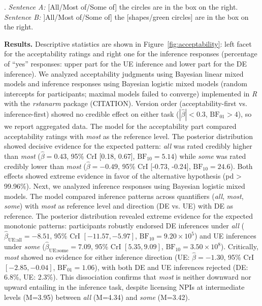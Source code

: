 \documentclass[12pt, a4]{article}
\begin{document}
\ex.\label{inftask}
\textit{Sentence A:} [All/Most of/Some of] the circles are in the box on the right.\\
\textit{Sentence B:} ]All/Most of/Some of] the [shapes/green circles] are in the box on the right.\vspace{-2mm}


\noindent \textbf{Results.} Descriptive statistics are shown in Figure~\ref{fig:acceptability}: left facet for the acceptability ratings and right one for the inference responses (percentage of ``yes'' responses: upper part for the UE inference and lower part for the DE inference). We analyzed acceptability judgments using Bayesian linear mixed models and inference responses using Bayesian logistic mixed models (random intercepts for participants; maximal models failed to converge) implemented in \textit{R} with the \textit{rstanarm} package (CITATION). Version order (acceptability-first vs. inference-first) showed no credible effect on either task ($|\hat{\beta}| < 0.3$, $\text{BF}_{01} > 4$), so we report aggregated data. The model for the acceptability part compared acceptability ratings with \textit{most} as the reference level. The posterior distribution showed decisive evidence for the expected pattern: \textit{all} was rated credibly higher than \textit{most} ($\hat{\beta}=0.43$, 95\% CrI [0.18, 0.67], $\text{BF}_{10}=5.14$) while \textit{some} was rated credibly lower than \textit{most} ($\hat{\beta}=-0.49$, 95\% CrI [-0.73, -0.24], $\text{BF}_{10}=24.6$). Both effects showed extreme evidence in favor of the alternative hypothesis (pd > 99.96\%). Next, we analyzed inference responses using Bayesian logistic mixed models. The model compared inference patterns across quantifiers (\textit{all}, \textit{most}, \textit{some}) with \textit{most} as reference level and direction (DE vs. UE) with DE as reference. The posterior distribution revealed extreme evidence for the expected monotonic patterns: participants robustly endorsed DE inferences under \textit{all} ($\hat{\beta}_{\text{UE:all}}=-8.51$, 95\% CrI $[-11.57, -5.97]$, $\text{BF}_{10}=9.20\times10^5$) and UE inferences under \textit{some} ($\hat{\beta}_{\text{UE:some}}=7.09$, 95\% CrI $[5.35, 9.09]$, $\text{BF}_{10}=3.50\times10^8$). Critically, \textit{most} showed no evidence for either inference direction (UE: $\hat{\beta}=-1.30$, 95\% CrI $[-2.85, -0.04]$, $\text{BF}_{01}=1.06$), with both DE and UE inferences rejected (DE: 6.8\%, UE: 2.3\%). This dissociation confirms that \textit{most} is neither downward nor upward entailing in the inference task, despite licensing NPIs at intermediate levels (M=3.95) between \textit{all} (M=4.34) and \textit{some} (M=3.42).
\end{document}
